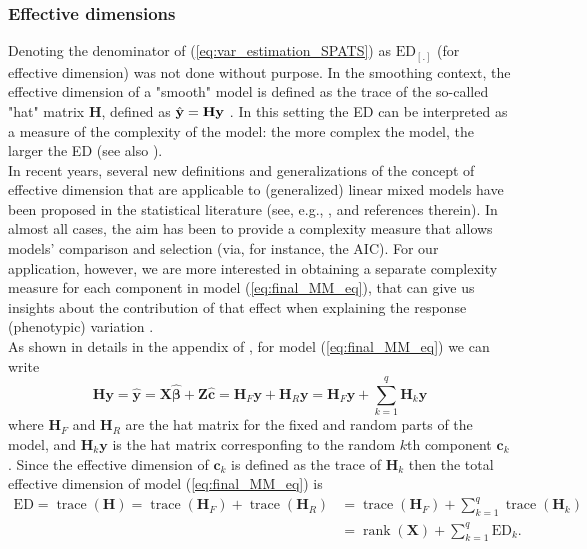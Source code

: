 \subsubsection{Effective dimensions}
Denoting the denominator of (\ref{eq:var_estimation_SPATS}) as $\mathrm{ED}_{[.]}$ (for effective dimension) was not done without purpose. In the smoothing context, the effective dimension of a "smooth" model is defined as the trace of the so-called "hat" matrix $\mathbf{H}$, defined as $\Hat{\mathbf{y}}=\mathbf{Hy}$ \parencite{hastie1990generalized}. In this setting the ED can be interpreted as a measure of the complexity of the model: the more complex the model, the larger the ED (see also \cite{eilers2015twenty}).\\
In recent years, several new definitions and generalizations of the concept of effective dimension that are applicable to (generalized) linear mixed models have been proposed in the statistical literature (see, e.g., \cite{you2016generalized}, and references therein). In almost all cases, the aim has been to provide a complexity measure that allows models' comparison and selection (via, for instance, the AIC). For our application, however, we are more interested in obtaining a separate complexity measure for each component in model (\ref{eq:final_MM_eq}), that can give us insights about the contribution of that effect when explaining the response (phenotypic) variation \parencite{cui2010partitioning}.\\
As shown in details in the appendix of \parencite{rodriguez-alvarez_correcting_2018}, for model (\ref{eq:final_MM_eq}) we can write
\begin{equation}
    \boldsymbol{H} \boldsymbol{y}=\widehat{\boldsymbol{y}}=\boldsymbol{X} \widehat{\boldsymbol{\beta}}+\mathbf{Z} \widehat{\boldsymbol{c}}=\boldsymbol{H}_{F} \boldsymbol{y}+\boldsymbol{H}_{R} \boldsymbol{y} =
    \boldsymbol{H}_{F} \boldsymbol{y} + \sum_{k=1}^{q} \mathbf{H}_{k}\mathbf{y}
\end{equation}
where $\boldsymbol{H}_{F}$ and $\boldsymbol{H}_{R}$ are the hat matrix for the fixed and random parts of the model, and $\mathbf{H}_{k}\mathbf{y}$ is the hat matrix corresponfing to the random $k$th component $\mathbf{c}_k$. Since the effective dimension of $\mathbf{c}_k$ is defined as the trace of $\mathbf{H}_k$ then the total effective dimension of model (\ref{eq:final_MM_eq}) is
\begin{equation}
    \begin{aligned}
        \mathrm{ED}=\operatorname{trace}(\boldsymbol{H})=\operatorname{trace}\left(\boldsymbol{H}_{F}\right)+\operatorname{trace}\left(\boldsymbol{H}_{R}\right)
        & = \operatorname{trace}\left(\boldsymbol{H}_{F}\right)+\sum_{k=1}^{q} \operatorname{trace}\left(\boldsymbol{H}_{k}\right) \\
        & =\operatorname{rank}(\boldsymbol{X})+\sum_{k=1}^{q} \mathrm{ED}_{k}.
    \end{aligned}
\end{equation}

